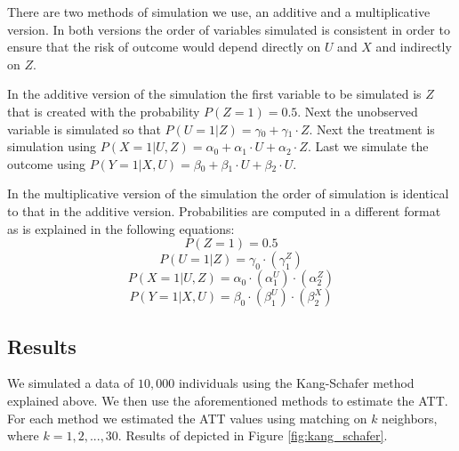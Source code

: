 \documentclass{article}
\begin{document}
There are two methods of simulation we use, an additive and a multiplicative version. In both versions the order of variables simulated is consistent in order to ensure that the risk of outcome would depend directly on $U$ and $X$ and indirectly on $Z$.

In the additive version of the simulation the first variable to be simulated is $Z$ that is created with the probability $P(Z=1)=0.5$.
Next the unobserved variable is simulated so that $P(U=1|Z)=\gamma{}_0 + \gamma{}_1\cdot{}Z$. Next the treatment is simulation using $P(X=1|U,Z) = \alpha{}_0 + \alpha{}_1 \cdot{} U + \alpha{}_2 \cdot{} Z$. Last we simulate the outcome using $P(Y=1|X,U) = \beta{}_0 + \beta{}_1 \cdot{} U + \beta{}_2 \cdot{} U$.

In the multiplicative version of the simulation the order of simulation is identical to that in the additive version. Probabilities are computed in a different format as is explained in the following equations:
$$P(Z=1)=0.5$$
$$P(U=1|Z)=\gamma_0\cdot{}(\gamma_1^Z)$$
$$P(X=1|U,Z)= \alpha_0\cdot(\alpha_1^U)\cdot(\alpha_2^Z)$$
$$P(Y=1|X,U) = \beta_0 \cdot (\beta_1^U) \cdot (\beta_2^X)$$

\subsection{Results}


We simulated a data of $10,000$ individuals using the Kang-Schafer method explained above. We then use the aforementioned methods to estimate the ATT. For each method we estimated the ATT values using matching on $k$ neighbors, where $k=1,2,...,30$. Results of depicted in Figure \ref{fig:kang_schafer}.
\end{document}
